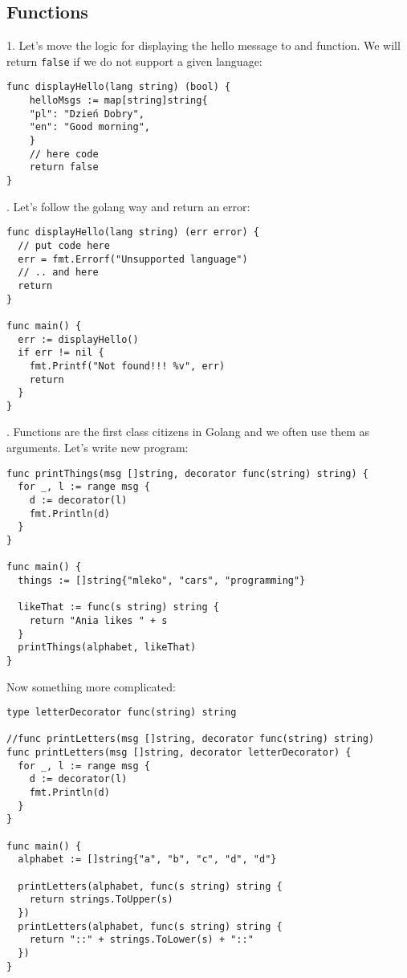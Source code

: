 \documentclass[11pt, letterpaper]{article}
\begin{document}
\subsection{Functions}

1. Let's move the logic for displaying the hello message to and function. We will return  \verb|false| if we do not support a given language:

\begin{verbatim}
func displayHello(lang string) (bool) {
    helloMsgs := map[string]string{
    "pl": "Dzień Dobry",
    "en": "Good morning",
    }
    // here code
    return false
}
\end{verbatim}

. Let's follow the golang way and return an error:

\begin{verbatim}
func displayHello(lang string) (err error) {
  // put code here
  err = fmt.Errorf("Unsupported language")
  // .. and here
  return
}

func main() {
  err := displayHello()
  if err != nil {
    fmt.Printf("Not found!!! %v", err)
    return
  }
}
\end{verbatim}

. Functions are the first class citizens in Golang and we often use them as arguments. Let's write new program:

\begin{verbatim}
func printThings(msg []string, decorator func(string) string) {
  for _, l := range msg {
    d := decorator(l)
    fmt.Println(d)
  }
}

func main() {
  things := []string{"mleko", "cars", "programming"}

  likeThat := func(s string) string {
    return "Ania likes " + s
  }
  printThings(alphabet, likeThat)
}
\end{verbatim}

Now something more complicated:

\begin{verbatim}
type letterDecorator func(string) string

//func printLetters(msg []string, decorator func(string) string)
func printLetters(msg []string, decorator letterDecorator) {
  for _, l := range msg {
    d := decorator(l)
    fmt.Println(d)
  }
}

func main() {
  alphabet := []string{"a", "b", "c", "d", "d"}

  printLetters(alphabet, func(s string) string {
    return strings.ToUpper(s)
  })
  printLetters(alphabet, func(s string) string {
    return "::" + strings.ToLower(s) + "::"
  })
}
\end{verbatim}
\end{document}
